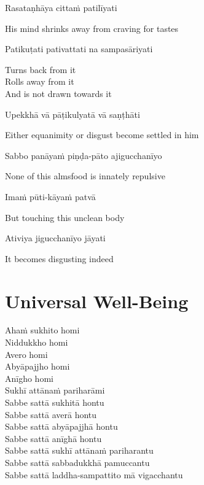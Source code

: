 Rasataṇhāya cittaṁ patilīyati

\begin{english}
  His mind shrinks away from craving for tastes
\end{english}

Patikuṭati pativattati na sampasāriyati

\begin{english}
  Turns back from it\\
  Rolls away from it\\
  And is not drawn towards it
\end{english}

Upekkhā vā pāṭikulyatā vā saṇṭhāti

\begin{english}
  Either equanimity or disgust become settled in him
\end{english}

\suttaRef{[AN 7.49]}

Sabbo panāyaṁ piṇḍa-pāto ajigucchanīyo

\begin{english}
  None of this almsfood is innately repulsive
\end{english}

Imaṁ pūti-kāyaṁ patvā

\begin{english}
  But touching this unclean body
\end{english}

Ativiya jigucchanīyo jāyati

\begin{english}
  It becomes disgusting indeed
\end{english}

\suttaRef{[Trad]}


\section{Universal Well-Being}
\label{universal-well-being}

\begin{leader}
\end{leader}

Ahaṁ sukhito homi\\
Niddukkho homi\\
Avero homi\\
Abyāpajjho homi\\
Anīgho homi\\
Sukhī attānaṁ pariharāmi\\
Sabbe sattā sukhitā hontu\\
Sabbe sattā averā hontu\\
Sabbe sattā abyāpajjhā hontu\\
Sabbe sattā anīghā hontu\\
Sabbe sattā sukhī attānaṁ pariharantu\\
Sabbe sattā sabbadukkhā pamuccantu\\
Sabbe sattā laddha-sampattito mā vigacchantu


